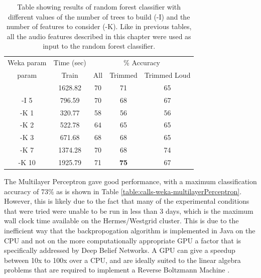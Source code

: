 \documentclass[12pt,oneside]{book}
\begin{document}
\begin{table}
\begin{tabular}{|c|c|c|c|c|}
\hline
\multicolumn{1}{|c|}{Weka param} & \multicolumn{1}{c|}{Time (sec)} & \multicolumn{3}{c|}{\% Accuracy} \\
\hhline{|-|-|-|-|-|}
param & Train & All & Trimmed & Trimmed Loud \\
\hhline{|=|=|=|=|=|}
        &   1628.82  &   70 & 71 & 65 \\
 -I 5   &    796.59  &   70 & 68 & 67 \\
 -K 1   &    320.77  &   58 & 56 & 56 \\
 -K 2   &    522.78  &   64 & 65 & 65 \\
 -K 3   &    671.68  &   68 & 68 & 65 \\
 -K 7   &   1374.28  &   70 & 68 & 74 \\
 -K 10  &   1925.79  &   71 & \textbf{75} & 67 \\
\hline
\end{tabular}
\caption{Table showing results of random forest
  classifier with different values of the number of trees to build
  (-I) and the number of features to consider (-K).  Like in previous
  tables, all the audio features described in this chapter were used
  as input to the random forest classifier.}
\label{table:calls-weka-randomForest}
\end{table}

The Multilayer Perceptron gave good performance, with a maximum
classification accuracy of 73\% as is shown in Table
\ref{table:calls-weka-multilayerPerceptron}.  However, this is likely
due to the fact that many of the experimental conditions that were
tried were unable to be run in less than 3 days, which is the maximum
wall clock time available on the Hermes/Westgrid cluster.  This is due
to the inefficient way that the backpropogation algorithm is
implemented in Java on the CPU and not on the more computationally
appropriate GPU a factor that is specifically addressed by Deep Belief
Networks.  A GPU can give a speedup between 10x to 100x over a CPU,
and are ideally suited to the linear algebra problems that are
required to implement a Reverse Boltzmann Machine
\cite{hinton1986learning}.
\end{document}
